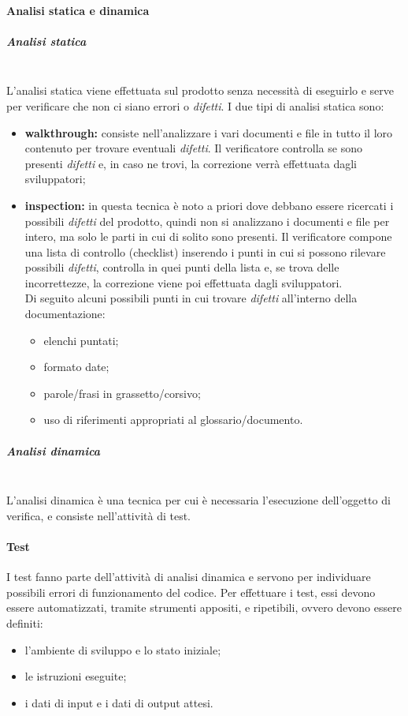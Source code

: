         \paragraph{Analisi statica e dinamica}
            \subparagraph{Analisi statica}\mbox{}\\
                L'analisi statica viene effettuata sul prodotto senza necessità di eseguirlo e serve per verificare che non ci siano errori o \textit{difetti}. I due tipi di analisi statica sono:
                \begin{itemize}
                    \item \textbf{walkthrough:} consiste nell'analizzare i vari documenti e file in tutto il loro contenuto per trovare eventuali \textit{difetti}. Il verificatore controlla se sono presenti \textit{difetti} e, in caso ne trovi, la correzione verrà effettuata dagli sviluppatori; 
                    \item \textbf{inspection:} in questa tecnica è noto a priori dove debbano essere ricercati i possibili \textit{difetti} del prodotto, quindi non si analizzano i documenti e file per intero, ma solo le parti in cui di solito sono presenti. Il verificatore compone una lista di controllo (checklist) inserendo i punti in cui si possono rilevare possibili \textit{difetti}, controlla in quei punti della lista e, se trova delle incorrettezze, la correzione viene poi effettuata dagli sviluppatori. \\
			Di seguito alcuni possibili punti in cui trovare \textit{difetti} all'interno della documentazione:
			\begin{itemize}
				\item elenchi puntati;
				\item formato date;
				\item parole/frasi in grassetto/corsivo;
				\item uso di riferimenti appropriati al glossario/documento.
			\end{itemize}
                \end{itemize}
            \subparagraph{Analisi dinamica}\mbox{}\\
                L'analisi dinamica è una tecnica per cui è necessaria l'esecuzione dell'oggetto di verifica, e consiste nell'attività di test.

            \paragraph{Test}
    			I test fanno parte dell'attività di analisi dinamica e servono per individuare possibili errori di funzionamento del codice. Per effettuare i test, essi devono essere automatizzati, tramite strumenti appositi, e ripetibili, ovvero devono essere definiti:
    			\begin{itemize}
    				\item l'ambiente di sviluppo e lo stato iniziale;
    				\item le istruzioni eseguite;
    				\item i dati di input e i dati di output attesi.
    			\end{itemize}

